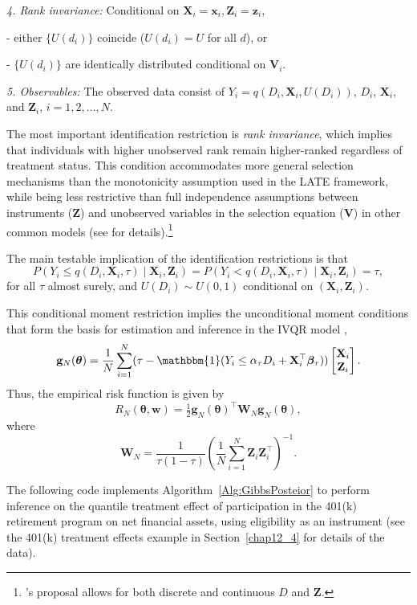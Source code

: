 \textit{4. Rank invariance:} Conditional on $\mathbf{X}_i=\mathbf{x}_i,\mathbf{Z}_i=\mathbf{z}_i$,

- either $\{U(d_i)\}$ coincide ($U(d_i)=U$ for all $d$), or
  
- $\{U(d_i)\}$ are identically distributed conditional on $\mathbf{V}_i$.  

\textit{5. Observables:} The observed data consist of $Y_i=q(D_i,\mathbf{X}_i,U(D_i))$, $D_i$, $\mathbf{X}_i$, and $\mathbf{Z}_i$, $i=1,2,\dots,N$.  

The most important identification restriction is \textit{rank invariance}, which implies that individuals with higher unobserved rank remain higher-ranked regardless of treatment status. This condition accommodates more general selection mechanisms than the monotonicity assumption used in the LATE framework, while being less restrictive than full independence assumptions between instruments ($\mathbf{Z}$) and unobserved variables in the selection equation ($\mathbf{V}$) in other common models (see \cite{chernozhukov2004effects,Chernozhukov2005} for details).\footnote{\cite{Chernozhukov2005}'s proposal allows for both discrete and continuous $D$ and $\mathbf{Z}$.} 

The main testable implication of the identification restrictions is that
\[
P\!\left(Y_i \leq q(D_i,\mathbf{X}_i,\tau)\mid \mathbf{X}_i,\mathbf{Z}_i\right)
= P\!\left(Y_i < q(D_i,\mathbf{X}_i,\tau)\mid \mathbf{X}_i,\mathbf{Z}_i\right)
= \tau,
\]
for all $\tau$ almost surely, and $U(D_i)\sim U(0,1)$ conditional on $(\mathbf{X}_i,\mathbf{Z}_i)$.  

This conditional moment restriction implies the unconditional moment conditions that form the basis for estimation and inference in the IVQR model \cite{chernozhukov2003mcmc,chernozhukov2004effects},
\[
\mathbf{g}_N(\boldsymbol{\theta})=\frac{1}{N}\sum_{i=1}^N (\tau-\mathbbm{1}(Y_i\leq \alpha_{\tau}D_i+\mathbf{X}_i^{\top}\boldsymbol{\beta}_{\tau}))\begin{bmatrix}
\mathbf{X}_i\\
\mathbf{Z}_i
\end{bmatrix}.
\]
Thus, the empirical risk function is given by 
\[
R_N(\boldsymbol{\theta},\mathbf{w})=\tfrac{1}{2}\mathbf{g}_N(\boldsymbol{\theta})^{\top}\mathbf{W}_N\mathbf{g}_N(\boldsymbol{\theta}),
\]
where
\[
\mathbf{W}_N=\frac{1}{\tau(1-\tau)}\left(\frac{1}{N}\sum_{i=1}^N \mathbf{Z}_i\mathbf{Z}_i^{\top}\right)^{-1}.
\]

The following code implements Algorithm~\ref{Alg:GibbsPosteior} to perform inference on the quantile treatment effect of participation in the 401(k) retirement program on net financial assets, using eligibility as an instrument (see the 401(k) treatment effects example in Section~\ref{chap12_4} for details of the data).

